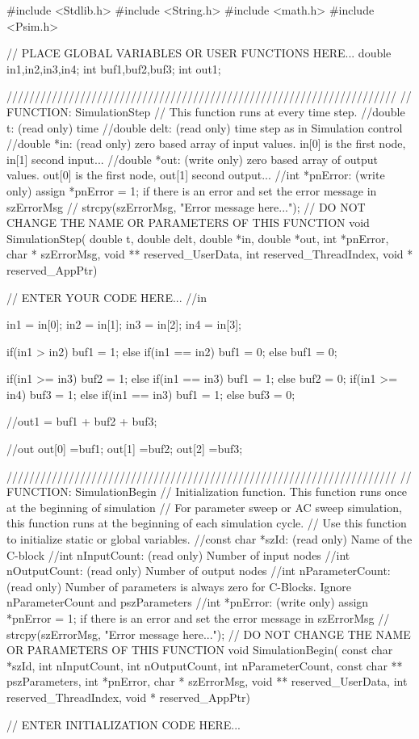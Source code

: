 \begin{mylisting}[language=c,caption=2番レグ用比較モジュール,label=hurokuB_hikakuB]

#include <Stdlib.h>
#include <String.h>
#include <math.h>
#include <Psim.h>

// PLACE GLOBAL VARIABLES OR USER FUNCTIONS HERE...
double in1,in2,in3,in4;
int buf1,buf2,buf3;
int out1;

/////////////////////////////////////////////////////////////////////
// FUNCTION: SimulationStep
//   This function runs at every time step.
//double t: (read only) time
//double delt: (read only) time step as in Simulation control
//double *in: (read only) zero based array of input values. in[0] is the first node, in[1] second input...
//double *out: (write only) zero based array of output values. out[0] is the first node, out[1] second output...
//int *pnError: (write only)  assign  *pnError = 1;  if there is an error and set the error message in szErrorMsg
//    strcpy(szErrorMsg, "Error message here..."); 
// DO NOT CHANGE THE NAME OR PARAMETERS OF THIS FUNCTION
void SimulationStep(
		double t, double delt, double *in, double *out,
		 int *pnError, char * szErrorMsg,
		 void ** reserved_UserData, int reserved_ThreadIndex, void * reserved_AppPtr)
{
// ENTER YOUR CODE HERE...
//in

in1 = in[0];
in2 = in[1];
in3 = in[2];
in4 = in[3];

	if(in1 > in2){
	buf1 = 1;
	}else if(in1 == in2){
	buf1 = 0;
	}else{
	buf1 = 0;
	}

	if(in1 >= in3){
	buf2 = 1;
	}else if(in1 == in3){
	buf1 = 1;
	}else{
	buf2 = 0;
	}
	if(in1 >= in4){
	buf3 = 1;
	}else if(in1 == in3){
	buf1 = 1;
	}else{
	buf3 = 0;
	}
	
	//out1 = buf1 + buf2 + buf3;

//out
out[0] =buf1;
out[1] =buf2;
out[2] =buf3;
}


/////////////////////////////////////////////////////////////////////
// FUNCTION: SimulationBegin
//   Initialization function. This function runs once at the beginning of simulation
//   For parameter sweep or AC sweep simulation, this function runs at the beginning of each simulation cycle.
//   Use this function to initialize static or global variables.
//const char *szId: (read only) Name of the C-block 
//int nInputCount: (read only) Number of input nodes
//int nOutputCount: (read only) Number of output nodes
//int nParameterCount: (read only) Number of parameters is always zero for C-Blocks.  Ignore nParameterCount and pszParameters
//int *pnError: (write only)  assign  *pnError = 1;  if there is an error and set the error message in szErrorMsg
//    strcpy(szErrorMsg, "Error message here..."); 
// DO NOT CHANGE THE NAME OR PARAMETERS OF THIS FUNCTION
void SimulationBegin(
		const char *szId, int nInputCount, int nOutputCount,
		 int nParameterCount, const char ** pszParameters,
		 int *pnError, char * szErrorMsg,
		 void ** reserved_UserData, int reserved_ThreadIndex, void * reserved_AppPtr)
{
// ENTER INITIALIZATION CODE HERE...




}
\end{mylisting}
